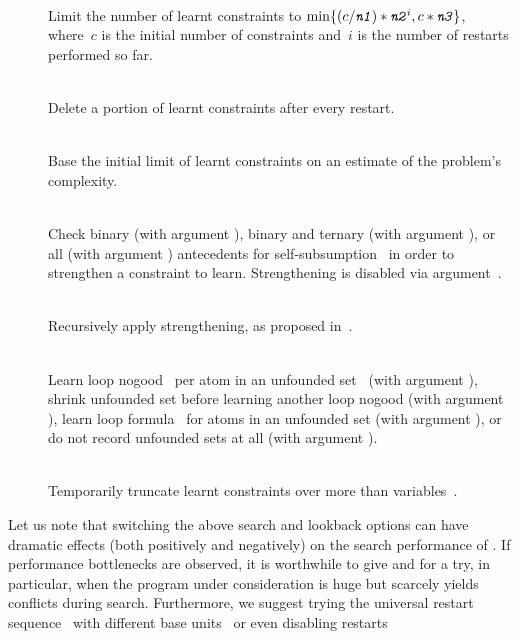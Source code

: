 \begin{description}
\item[]~\\
Limit the number of learnt constraints to 
$\min\{(c/\texttt{\textit{n1}})*\texttt{\textit{n2}}^i,c*\texttt{\textit{n3}}\}$,
where~$c$ is the initial number of constraints and~$i$ is the number of restarts performed so far.
\item[]~\\
Delete a portion of learnt constraints after every restart.
\item[]~\\
Base the initial limit of learnt constraints on an estimate
of the problem's complexity.
\item[]~\\
Check binary (with argument ),
binary and ternary (with argument ), or 
all (with argument ) antecedents for
self-subsumption~\cite{eenbie05a}
in order to strengthen a constraint to learn.
Strengthening is disabled via argument~.
\item[]~\\
Recursively apply strengthening, as proposed in~\cite{soreen05a}.
\item[]~\\
Learn loop nogood~\cite{gekanesc07a,gekasc09c} per atom in an unfounded set~\cite{gerosc91a}
(with argument ),
shrink unfounded set before learning another loop nogood
(with argument ),
learn loop formula~\cite{linzha04a} for atoms in an unfounded set
(with argument ),
or do not record unfounded sets at all
(with argument ).
\item[]~\\
Temporarily truncate learnt constraints over more than  variables~\cite{ryan04a}.
\end{description}
%
Let us note that switching the above search and lookback options can have dramatic effects
(both positively and negatively) on the search performance of \clasp.
If performance bottlenecks are observed, it is worthwhile to give 
 and  for  a try, in particular,
when the program under consideration is huge 
but scarcely yields conflicts during search.
Furthermore, we suggest trying the universal restart sequence~\cite{lusizu93a}
with different base units~ or even disabling restarts
